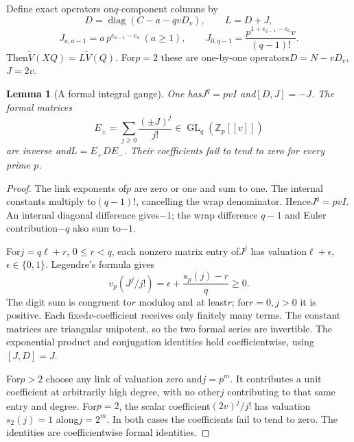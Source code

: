 \documentclass[11pt]{article}
\newtheorem{lemma}{Lemma}\newtheorem{theorem}[lemma]{Theorem}
\begin{document}
Define exact operators on$q$-component columns by
\[
 D=\operatorname{diag}(C-a-qvD_v),\qquad L=D+J,
\]
\[
 J_{a,a-1}=a\,p^{e_{a-1}-e_a}\ (a\ge1),\qquad
 J_{0,q-1}=\frac{p^{1+e_{q-1}-e_0}v}{(q-1)!}.
\]
Then$\widetilde V(XQ)=L\widetilde V(Q)$.
For$p=2$ these are one-by-one operators$D=N-vD_v$, $J=2v$.

\begin{lemma}[A formal integral gauge]\label{lem:gauge}
One has$J^q=pvI$ and$[D,J]=-J$.
The formal matrices
\[
 E_\pm=\sum_{j\ge0}\frac{(\pm J)^j}{j!}
                    \in\operatorname{GL}_q(\mathbb Z_p[[v]])
\]
are inverse and$L=E_+DE_-$.
Their coefficients fail to tend to zero for every prime $p$.
\end{lemma}
\begin{proof}
The link exponents of$p$ are zero or one and sum to one.
The internal constants multiply to$(q-1)!$, cancelling the wrap
denominator. Hence$J^q=pvI$.
An internal diagonal difference gives$-1$; the wrap difference
$q-1$ and Euler contribution$-q$ also sum to$-1$.

For$j=q\ell+r$, $0\le r<q$, each nonzero matrix entry of$J^j$
has valuation$\ell+\epsilon$, $\epsilon\in\{0,1\}$.
Legendre's formula gives
\[
 v_p(J^j/j!)=\epsilon+\frac{s_p(j)-r}{q}\ge0.
\]
The digit sum is congruent to$r$ modulo$q$ and at least$r$;
for$r=0,j>0$ it is positive.
Each fixed$v$-coefficient receives only finitely many terms.
The constant matrices are triangular unipotent, so the two
formal series are invertible.
The exponential product and conjugation identities hold
coefficientwise, using$[J,D]=J$.

For$p>2$ choose any link of valuation zero and$j=p^m$.
It contributes a unit coefficient at arbitrarily high degree,
with no other$j$ contributing to that same entry and degree.
For$p=2$, the scalar coefficient$(2v)^j/j!$ has valuation
$s_2(j)=1$ along$j=2^m$.
In both cases the coefficients fail to tend to zero.
The identities are coefficientwise formal identities.
\end{proof}
\end{document}
